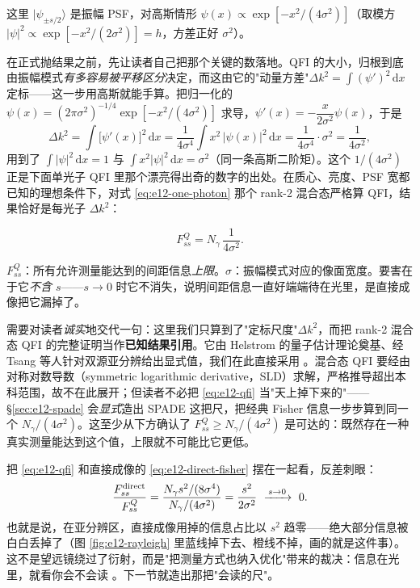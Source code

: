 这里 \(|\psi_{\pm s/2}\rangle\) 是振幅 PSF，对高斯情形 \(\psi(x)\propto\exp[-x^2/(4\sigma^2)]\)（取模方 \(|\psi|^2\propto\exp[-x^2/(2\sigma^2)]=h\)，方差正好 \(\sigma^2\)）。

在正式抛结果之前，先让读者自己把那个关键的数落地。QFI 的大小，归根到底由振幅模式\emph{有多容易被平移区分}决定，而这由它的"动量方差"\(\Delta k^2=\int(\psi')^2\,\mathrm{d}x\) 定标——这一步用高斯就能手算。把归一化的 \(\psi(x)=(2\pi\sigma^2)^{-1/4}\exp[-x^2/(4\sigma^2)]\) 求导，\(\psi'(x)=-\dfrac{x}{2\sigma^2}\psi(x)\)，于是
\[
  \Delta k^2=\int\big[\psi'(x)\big]^2\,\mathrm{d}x
  =\frac{1}{4\sigma^4}\int x^2\,|\psi(x)|^2\,\mathrm{d}x
  =\frac{1}{4\sigma^4}\cdot\sigma^2
  =\frac{1}{4\sigma^2},
\]
用到了 \(\int|\psi|^2\,\mathrm{d}x=1\) 与 \(\int x^2|\psi|^2\,\mathrm{d}x=\sigma^2\)（同一条高斯二阶矩）。这个 \(1/(4\sigma^2)\) 正是下面单光子 QFI 里那个漂亮得出奇的数字的出处。在质心、亮度、PSF 宽都已知的理想条件下，对式 \eqref{eq:e12-one-photon} 那个 rank-2 混合态严格算 QFI，结果恰好是每光子 \(\Delta k^2\)：

\begin{equation}
  F_{ss}^{Q}=N_\gamma\,\frac{1}{4\sigma^{2}}.
  \label{eq:e12-qfi}
\end{equation}
\begin{formulaexplain}
\(F_{ss}^{Q}\)：所有允许测量能达到的间距信息\emph{上限}。\(\sigma\)：振幅模式对应的像面宽度。要害在于它\emph{不含 \(s\)}——\(s\to0\) 时它不消失，说明间距信息一直好端端待在光里，是直接成像把它漏掉了。
\end{formulaexplain}

需要对读者\emph{诚实}地交代一句：这里我们只算到了"定标尺度"\(\Delta k^2\)，而把 rank-2 混合态 QFI 的完整证明当作\textbf{已知结果引用}。它由 Helstrom 的量子估计理论奠基、经 Tsang 等人针对双源亚分辨给出显式值，我们在此直接采用 \citep{1969JSP.....1..231H,2016PhRvX...6c1033T}。混合态 QFI 要经由对称对数导数（symmetric logarithmic derivative，SLD）求解，严格推导超出本科范围，故不在此展开；但读者不必把 \eqref{eq:e12-qfi} 当"天上掉下来的"——\S\ref{sec:e12-spade} 会\emph{显式}造出 SPADE 这把尺，把经典 Fisher 信息一步步算到同一个 \(N_\gamma/(4\sigma^2)\)。这至少从下方确认了 \(F_{ss}^{Q}\ge N_\gamma/(4\sigma^2)\) 是可达的：既然存在一种真实测量能达到这个值，上限就不可能比它更低。

把 \eqref{eq:e12-qfi} 和直接成像的 \eqref{eq:e12-direct-fisher} 摆在一起看，反差刺眼：
\[
  \frac{F_{ss}^{\rm direct}}{F_{ss}^{Q}}
  =\frac{N_\gamma s^2/(8\sigma^4)}{N_\gamma/(4\sigma^2)}
  =\frac{s^2}{2\sigma^2}\ \xrightarrow{\,s\to0\,}\ 0.
\]
也就是说，在亚分辨区，直接成像用掉的信息占比以 \(s^2\) 趋零——绝大部分信息被白白丢掉了（图 \ref{fig:e12-rayleigh} 里蓝线掉下去、橙线不掉，画的就是这件事）。这不是望远镜绕过了衍射，而是"把测量方式也纳入优化"带来的裁决：信息在光里，就看你会不会读 \citep{1969JSP.....1..231H,2016PhRvX...6c1033T,2016OExpr..24.3684N}。下一节就造出那把"会读的尺"。


